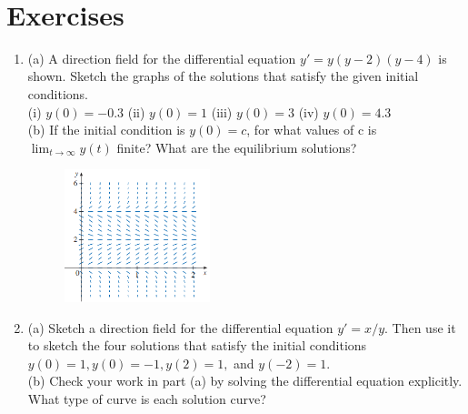 \documentclass[12pt, a4paper]{article}
\begin{document}
\hrulefill
\vspace{1em}
\\
\section*{Exercises}
\begin{enumerate}
    \item (a) A direction field for the differential equation $y' = y(y-2)(y-4)$ is shown. Sketch the graphs of the solutions that satisfy the given initial conditions. \\
    (i) $y(0) = -0.3$ \quad (ii) $y(0) = 1$ \quad (iii) $y(0) = 3$ \quad (iv) $y(0) = 4.3$ \\
    (b) If the initial condition is $y(0)=c$, for what values of c is $\lim_{t \to \infty} y(t)$ finite? What are the equilibrium solutions?
     \begin{figure}[htbp] %
        \centering %
       \includegraphics[width=0.4\textwidth]{graph5.png} %
   \end{figure}

    \item (a) Sketch a direction field for the differential equation $y' = x/y$. Then use it to sketch the four solutions that satisfy the initial conditions $y(0)=1, y(0)=-1, y(2)=1,$ and $y(-2)=1$. \\
    (b) Check your work in part (a) by solving the differential equation explicitly. What type of curve is each solution curve?
    

\end{enumerate}
\end{document}
